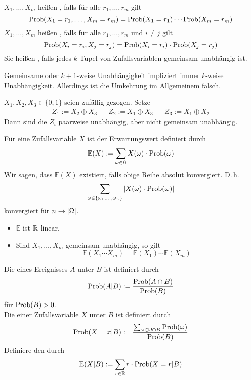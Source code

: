 \Def{}
$X_1,\ldots, X_m$ heißen , falls für alle $r_1,\ldots, r_m$ gilt
\[ \P(X_1 = r_1, \ldots, X_m = r_m) = \P(X_1 = r_1) \cdots \P(X_m = r_m) \]
$X_1,\ldots, X_m$ heißen , falls für alle $r_1,\ldots, r_m$ und $i\neq j$ gilt
\[ \P(X_i = r_i,  X_j = r_j) = \P(X_i = r_i) \cdot \P(X_j = r_j) \]
Sie heißen , falls jedes $k$-Tupel von Zufallsvariablen gemeinsam unabhängig ist.

\Bem{}
Gemeinsame oder $k+1$-weise Unabhängigkeit impliziert immer $k$-weise Unabhängigkeit. Allerdings ist die Umkehrung im Allgemeinem falsch.

\Bsp{}
$X_1,X_2,X_3\in \{0,1\}$ seien zufällig gezogen. Setze
\begin{align*}
Z_1 := X_2 \oplus X_3 && Z_2 := X_1 \oplus X_3 && Z_3 := X_1 \oplus X_2
\end{align*}
Dann sind die $Z_i$ paarweise unabhängig, aber nicht gemeinsam unabhängig.

\renewcommand{\E}{\mathbb{E}}

\Def{}
Für eine Zufallsvariable $X$ ist der Erwartungswert definiert durch
\[ \E(X) := \sum_{\omega \in \Omega} X(\omega) \cdot \P(\omega) \]
Wir sagen, dass $\E(X)$ existiert, falls obige Reihe absolut konvergiert. D.\,h.
\[ \sum_{\omega \in \{\omega_1,\ldots, \omega_n\}} \bet{X(\omega) \cdot \P(\omega)}  \]
konvergiert für $n \pfeil{} \bet{\Omega}$.

\Bem{}
\begin{itemize}
	\item $\E$ ist $\R$-linear.
	\item Sind $X_1,\ldots, X_m$ gemeinsam unabhängig, so gilt
	\[ \E(X_1 \cdots X_m) = \E(X_1) \cdots \E(X_m) \]
\end{itemize}

\Def{}
Die  eines Ereignisses $A$ unter $B$ ist definiert durch
\[ \P(A|B) := \frac{\P(A\cap B)}{\P(B)} \]
für $\P(B) > 0$.\\
Die  einer Zufallsvariable $X$ unter $B$ ist definiert durch
\[ \P(X = x|B) := \frac{\sum_{\omega \in \Omega \cap B} \P(\omega)}{\P(B)} \]
Definiere den  durch
\[ \E(X | B) := \sum_{r \in \R} r\cdot \P(X = r | B) \]